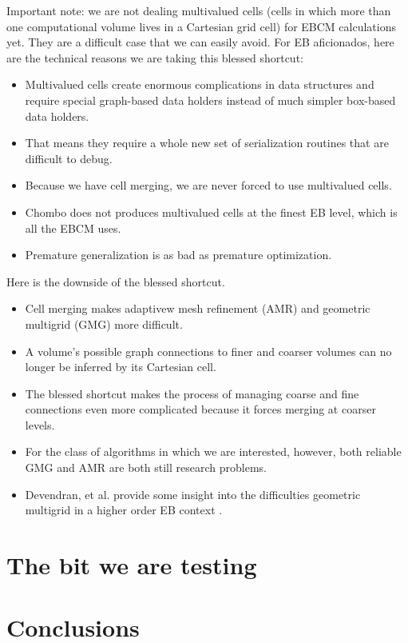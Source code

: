 \documentclass{article}
\begin{document}
Important note: we are not dealing multivalued cells (cells in which
more than one computational volume lives in a Cartesian grid cell) for
EBCM calculations yet.  They are a difficult case that we can easily
avoid.  For EB aficionados, here are the technical reasons we are
taking this blessed shortcut:
\begin{itemize}
  \item Multivalued cells create enormous complications in data
    structures and require special graph-based data holders instead of
    much simpler box-based data holders.
 \item That means they require a whole new set of serialization
   routines that are difficult to debug.   
 \item Because we have cell merging, we are never forced to use
   multivalued cells.
 \item Chombo does not produces multivalued cells at the finest EB
   level, which is all the EBCM uses.
 \item Premature generalization is as bad as premature optimization.
\end{itemize}
Here is the downside of the blessed shortcut.
\begin{itemize}
\item Cell merging makes adaptivew mesh refinement (AMR)
  and geometric multigrid (GMG) more difficult.   
\item A volume's possible graph connections to finer and coarser
  volumes can no longer be inferred by its Cartesian cell.
\item The blessed shortcut makes the process of managing coarse and
  fine connections even more complicated because it forces merging at
  coarser levels. 
\item For the class of algorithms in which we are interested, however,
  both  reliable GMG and AMR are both still research  problems.
\item  Devendran, et al. provide some insight into the difficulties
  geometric multigrid in a higher order EB context \cite{Devendran2014}.
\end{itemize}

\section{The bit we are testing}





\section{Conclusions}



\renewcommand{\thefootnote}{\fnsymbol{footnote}}\

\end{document}
